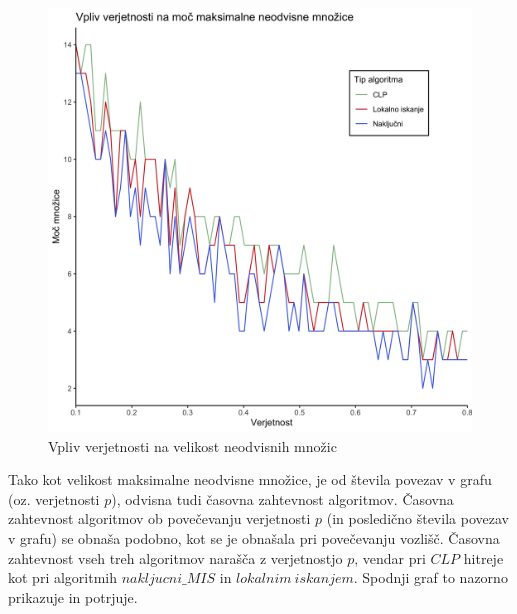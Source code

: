 \documentclass[a4paper, 12pt]{article}
\begin{document}
\begin{figure}[h!]
	\begin{center}
		\includegraphics[scale=0.12]{R_koda/ver-moc.png}
		\caption{Vpliv verjetnosti na velikost neodvisnih množic}
	\end{center}
\end{figure}

\noindent Tako kot velikost maksimalne neodvisne množice, je od števila povezav v grafu (oz. verjetnosti $p$), odvisna tudi časovna zahtevnost algoritmov. Časovna zahtevnost algoritmov ob povečevanju verjetnosti $p$ 
(in posledično števila povezav v grafu) se obnaša podobno, kot se je obnašala pri povečevanju vozlišč. Časovna zahtevnost vseh treh algoritmov narašča z verjetnostjo $p$, vendar pri $CLP$ hitreje kot pri algoritmih
$nakljucni\_MIS$ in $lokalnim\ iskanjem$. Spodnji graf to nazorno prikazuje in potrjuje.
\end{document}
